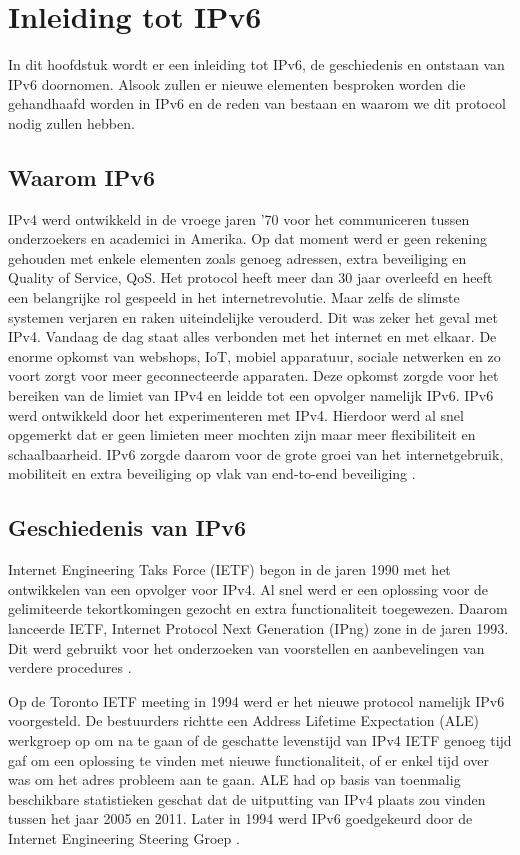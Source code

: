 
\chapter{Inleiding tot IPv6}
\label{ch:h1}

In dit hoofdstuk wordt er een inleiding tot IPv6, de geschiedenis en ontstaan van IPv6 doornomen. Alsook zullen er nieuwe elementen besproken worden die gehandhaafd worden in IPv6 en de reden van bestaan en waarom we dit protocol nodig zullen hebben.

\section{Waarom IPv6}

IPv4 werd ontwikkeld in de vroege jaren ’70 voor het communiceren tussen onderzoekers en academici in Amerika. Op dat moment werd er geen rekening gehouden met enkele elementen zoals genoeg adressen, extra beveiliging en Quality of Service, QoS. Het protocol heeft meer dan 30 jaar overleefd en heeft een belangrijke rol gespeeld in het internetrevolutie. Maar zelfs de slimste systemen verjaren en raken uiteindelijke verouderd. Dit was zeker het geval met IPv4. Vandaag de dag staat alles verbonden met het internet en met elkaar. De enorme opkomst van webshops, IoT, mobiel apparatuur, sociale netwerken en zo voort zorgt voor meer geconnecteerde apparaten.  Deze opkomst zorgde voor het bereiken van de limiet van IPv4 en leidde tot een opvolger namelijk IPv6. 
IPv6 werd ontwikkeld door het experimenteren met IPv4. Hierdoor werd al snel opgemerkt dat er geen limieten meer mochten zijn maar meer flexibiliteit en schaalbaarheid. IPv6 zorgde daarom voor de grote groei van het internetgebruik, mobiliteit en extra beveiliging op vlak van end-to-end beveiliging \autocite{Hagen2014}.

\section{Geschiedenis van IPv6}

Internet Engineering Taks Force (IETF) begon in de jaren 1990 met het ontwikkelen van een opvolger voor IPv4. Al snel werd er een oplossing voor de gelimiteerde tekortkomingen gezocht en extra functionaliteit toegewezen. Daarom lanceerde IETF, Internet Protocol Next Generation (IPng) zone in de jaren 1993. Dit werd gebruikt voor het onderzoeken van voorstellen en aanbevelingen van verdere procedures \autocite{Hagen2014}.

Op de Toronto IETF meeting in 1994 werd er het nieuwe protocol namelijk IPv6 voorgesteld. De bestuurders richtte een Address Lifetime Expectation (ALE) werkgroep op om na te gaan of de geschatte levenstijd van IPv4 IETF genoeg tijd gaf om een oplossing te vinden met nieuwe functionaliteit, of er enkel tijd over was om het adres probleem aan te gaan. ALE had op basis van toenmalig beschikbare statistieken geschat dat de uitputting van IPv4 plaats zou vinden tussen het jaar 2005 en 2011. Later in 1994 werd IPv6 goedgekeurd door de Internet Engineering Steering Groep \autocite{Hagen2014}.

